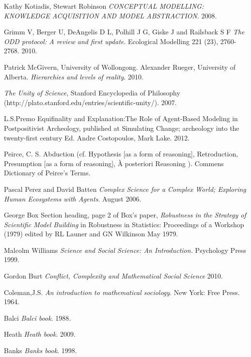 \documentclass[11pt,oneside,a4paper,openright]{report}
\begin{document}
\begin{thebibliography}{50}
	Kathy Kotiadis, Stewart Robinson
	\emph{CONCEPTUAL MODELLING: KNOWLEDGE ACQUISITION AND MODEL ABSTRACTION}.
	2008.

	Grimm V, Berger U, DeAngelis D L, Polhill J G, Giske J and Railsback S F 
	\emph{The ODD protocol: A review and first update}. 
	Ecological Modelling 221 (23), 2760-2768.
	2010. 
	

	Patrick McGivern, University of Wollongong.
	Alexander Rueger, University of Alberta.
	\emph{Hierarchies and levels of reality}.
	2010.

	\emph{The Unity of Science}, Stanford Encyclopedia of Philosophy 
	(http://plato.stanford.edu/entries/scientific-unity/).
	2007.

	L.S.Premo
	Equifinality and Explanation:The Role of Agent-Based Modeling in Postpositivist Archeology, 
	published at Simulating Change; archeology into the twenty-first century Ed. Andre Costopoulos, Mark Lake.
	2012.

	Peirce, C. S. 
	Abduction (cf. Hypothesis [as a form of reasoning], Retroduction, Presumption [as a form of reasoning], À posteriori Reasoning ). Commens Dictionary of Peirce's Terms.
	
	Pascal Perez and David Batten
	\emph{Complex Science for a Complex World; Exploring Human Ecosystems with Agents}. 
	August 2006.

	George Box 
	Section heading, page 2 of Box's paper, 
	\emph{Robustness in the Strategy of Scientific Model Building} in Robustness in Statistics: Proceedings of a Workshop (1979) 
	edited by RL Launer and GN Wilkinson
	May 1979.

	Malcolm Williams
	\emph{Science and Social Science: An Introduction.} Psychology Press 
	1999. 

	Gordon Burt
	\emph{Conflict, Complexity and Mathematical Social Science}
	2010.

	Coleman,J.S.
	\emph{An introduction to mathematical sociology}. New York: Free Press.
	1964.

	Balci
	\emph{Balci book}.
	1988.

	Heath
	\emph{Heath book}.
	2009.

	Banks
	\emph{Banks book}.
	1998.


\end{thebibliography}
\end{document}
